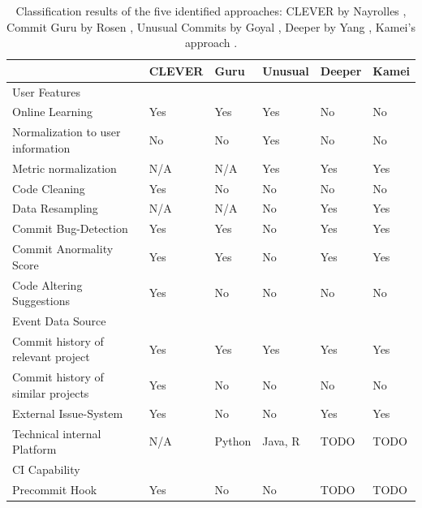 \begin{table}[t]
	\centering
	\caption{Classification results of the five identified approaches: CLEVER by Nayrolles \cite{Nayrolles2018}, Commit Guru by Rosen \cite{Rosen2015}, Unusual Commits by Goyal \cite{Goyal2017}, Deeper by Yang \cite{Yang2015}, Kamei's approach \cite{Kamei2013}.}
	\begin{tabular}{@{}llllll@{}}
		\toprule
		& CLEVER     & Guru   & Unusual & Deeper & Kamei \\ \midrule
		User Features                      &            &        &         &        &       \\ \midrule
		Online Learning                    & Yes        & Yes    & Yes     & No     & No    \\
		Normalization to user information  & No         & No     & Yes     & No     & No    \\
		Metric normalization               & N/A        & N/A    & Yes     & Yes    & Yes   \\
		Code Cleaning                      & Yes        & No     & No      & No     & No    \\
		Data Resampling                    & N/A        & N/A    & No      & Yes    & Yes   \\
		Commit Bug-Detection               & Yes        & Yes    & No      & Yes    & Yes   \\
		Commit Anormality Score            & Yes        & Yes    & No      & Yes    & Yes   \\
		Code Altering Suggestions          & Yes        & No     & No      & No     & No    \\ \midrule
		Event Data Source                  &            &        &         &        &       \\ \midrule
		Commit history of relevant project & Yes        & Yes    & Yes     & Yes    & Yes   \\
		Commit history of similar projects & Yes        & No     & No      & No     & No    \\
		External Issue-System              & Yes        & No     & No      & Yes    & Yes   \\ \midrule
		Technical internal Platform        & N/A        & Python & Java, R & TODO   & TODO  \\ \midrule
		CI Capability                      &            &        &         &        &       \\ \midrule
		Precommit Hook                     & Yes        & No     & No      & TODO   & TODO  \\

\end{tabular}
\end{table}
